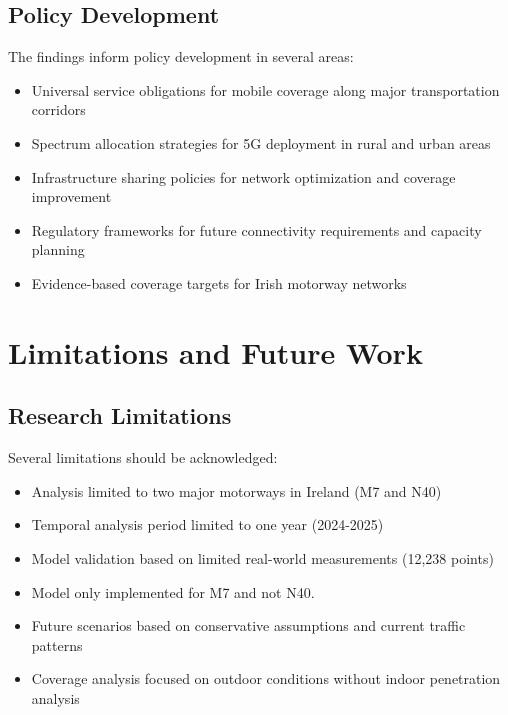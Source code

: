 \documentclass[MScCS]{uccthesis}
\begin{document}
\subsection{Policy Development}
The findings inform policy development in several areas:
\begin{itemize}
\item Universal service obligations for mobile coverage along major transportation corridors
\item Spectrum allocation strategies for 5G deployment in rural and urban areas
\item Infrastructure sharing policies for network optimization and coverage improvement
\item Regulatory frameworks for future connectivity requirements and capacity planning
\item Evidence-based coverage targets for Irish motorway networks
\end{itemize}

\section{Limitations and Future Work}

\subsection{Research Limitations}
Several limitations should be acknowledged:
\begin{itemize}
\item Analysis limited to two major motorways in Ireland (M7 and N40)
\item Temporal analysis period limited to one year (2024-2025)
\item Model validation based on limited real-world measurements (12,238 points)
\item Model only implemented for M7 and not N40.
\item Future scenarios based on conservative assumptions and current traffic patterns
\item Coverage analysis focused on outdoor conditions without indoor penetration analysis
\end{itemize}
\end{document}
